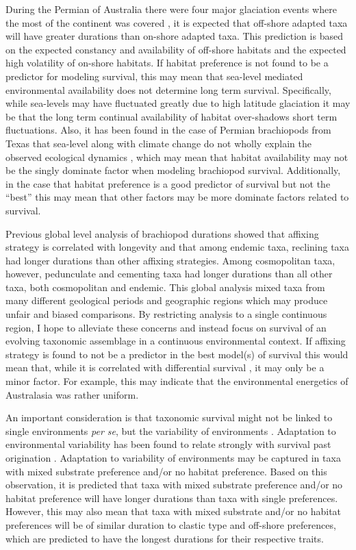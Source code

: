 \documentclass[12pt,letterpaper]{article}
\begin{document}
During the Permian of Australia there were four major glaciation events where the most of the continent was covered \citep{Fielding2008,Birgenheier2010,Fielding2008a,Fielding2006}, it is expected that off-shore adapted taxa will have greater durations than on-shore adapted taxa. This prediction is based on the expected constancy and availability of off-shore habitats and the expected high volatility of on-shore habitats. If habitat preference is not found to be a predictor for modeling survival, this may mean that sea-level mediated environmental availability does not determine long term survival. Specifically, while sea-levels may have fluctuated greatly due to high latitude glaciation \citep{Fielding2008,Fielding2008a,Birgenheier2010} it may be that the long term continual availability of habitat over-shadows short term fluctuations. Also, it has been found in the case of Permian brachiopods from Texas that sea-level along with climate change do not wholly explain the observed ecological dynamics \citep{Olszewski2004}, which may mean that habitat availability may not be the singly dominate factor when modeling brachiopod survival. Additionally, in the case that habitat preference is a good predictor of survival but not the ``best'' this may mean that other factors may be more dominate factors related to survival.

Previous global level analysis of brachiopod durations showed that affixing strategy is correlated with longevity \citep{Alexander1977} and that among endemic taxa, reclining taxa had longer durations than other affixing strategies. Among cosmopolitan taxa, however, pedunculate and cementing taxa had longer durations than all other taxa, both cosmopolitan and endemic. This global analysis mixed taxa from many different geological periods and geographic regions which may produce unfair and biased comparisons. By restricting analysis to a single continuous region, I hope to alleviate these concerns and instead focus on survival of an evolving taxonomic assemblage in a continuous environmental context.  If affixing strategy is found to not be a predictor in the best model(s) of survival this would mean that, while it is correlated with differential survival \citep{Alexander1977}, it may only be a minor factor. For example, this may indicate that the environmental energetics of Australasia was rather uniform. 

An important consideration is that taxonomic survival might not be linked to single environments \textit{per se}, but the variability of environments \citep{Foote2013,Heim2011,Liow2007b}. Adaptation to environmental variability has been found to relate strongly with survival past origination \citep{Foote2013}. Adaptation to variability of environments may be captured in taxa with mixed substrate preference and/or no habitat preference. Based on this observation, it is predicted that taxa with mixed substrate preference and/or no habitat preference will have longer durations than taxa with single preferences. However, this may also mean that taxa with mixed substrate and/or no habitat preferences will be of similar duration to clastic type and off-shore preferences, which are predicted to have the longest durations for their respective traits.
\end{document}
